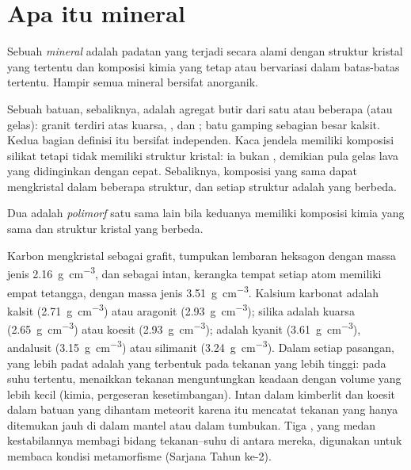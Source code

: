 \section{Apa itu mineral}

\begin{definition}[Mineral]\label{def:b1:rock-forming-minerals:mineral}
Sebuah \emph{mineral} adalah padatan yang terjadi secara alami dengan struktur kristal yang tertentu dan komposisi kimia yang tetap atau bervariasi dalam batas-batas tertentu. Hampir semua mineral bersifat anorganik.
\end{definition}

Sebuah batuan, sebaliknya, adalah agregat butir dari satu atau beberapa  (atau gelas): granit terdiri atas kuarsa, , dan ; batu gamping sebagian besar kalsit. Kedua bagian definisi itu bersifat independen. Kaca jendela memiliki komposisi silikat tetapi tidak memiliki struktur kristal: ia bukan , demikian pula gelas lava yang didinginkan dengan cepat. Sebaliknya, komposisi yang sama dapat mengkristal dalam beberapa struktur, dan setiap struktur adalah  yang berbeda.

\begin{definition}[Polimorf]\label{def:b1:rock-forming-minerals:polymorph}
Dua  adalah \emph{polimorf} satu sama lain bila keduanya memiliki komposisi kimia yang sama dan struktur kristal yang berbeda.
\end{definition}

Karbon mengkristal sebagai grafit, tumpukan lembaran heksagon dengan massa jenis \qty{2.16}{g.cm^{-3}}, dan sebagai intan, kerangka tempat setiap atom memiliki empat tetangga, dengan massa jenis \qty{3.51}{g.cm^{-3}}. Kalsium karbonat adalah kalsit (\qty{2.71}{g.cm^{-3}}) atau aragonit (\qty{2.93}{g.cm^{-3}}); silika adalah kuarsa (\qty{2.65}{g.cm^{-3}}) atau koesit (\qty{2.93}{g.cm^{-3}});  adalah kyanit (\qty{3.61}{g.cm^{-3}}), andalusit (\qty{3.15}{g.cm^{-3}}) atau silimanit (\qty{3.24}{g.cm^{-3}}).
Dalam setiap pasangan,  yang lebih padat adalah yang terbentuk pada tekanan yang lebih tinggi: pada suhu tertentu, menaikkan tekanan menguntungkan keadaan dengan volume yang lebih kecil (kimia, pergeseran kesetimbangan). Intan dalam kimberlit dan koesit dalam batuan yang dihantam meteorit karena itu mencatat tekanan yang hanya ditemukan jauh di dalam mantel atau dalam tumbukan. Tiga  , yang medan kestabilannya membagi bidang tekanan--suhu di antara mereka, digunakan untuk membaca kondisi metamorfisme (Sarjana Tahun ke-2).

